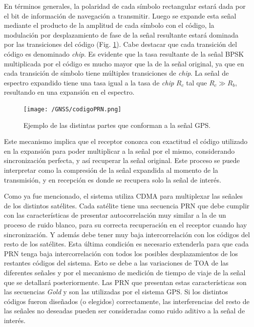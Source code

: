 \documentclass[a4paper,12pt,oneside,onecolumn,final,openright]{book}%
\begin{document}
	En términos generales, la polaridad de cada símbolo rectangular estará dada por el bit de información de navegación a transmitir. Luego se expande esta señal mediante el producto de la amplitud de cada símbolo con el código, la modulación por desplazamiento de fase de la señal resultante estará dominada por las transiciones del código (Fig. \ref{fig:PRN}). Cabe destacar que cada transición del código es denominado \textit{chip}. Es evidente que la tasa resultante de la señal BPSK multiplicada por el código es mucho mayor que la de la señal original, ya que en cada transición de símbolo tiene múltiples transiciones de \textit{chip}. La señal de espectro expandido tiene una tasa igual a la tasa de \textit{chip} $R_c$ tal que $R_c \gg R_b$, resultando en una expansión en el espectro.
\begin{figure}%
    \centering
    \texttt{[image: /GNSS/codigoPRN.png]}
    \caption{Ejemplo de las distintas partes que conforman a la señal GPS.}
    \label{fig:PRN}
\end{figure}

	Este mecanismo implica que el receptor conozca con exactitud el código utilizado en la expansión para poder multiplicar a la señal por el mismo, considerando sincronización perfecta, y así recuperar la señal original. Este proceso se puede interpretar como la compresión de la señal expandida al momento de la transmisión, y en recepción es donde se recupera solo la señal de interés.
	
	Como ya fue mencionado, el sistema utiliza CDMA para multiplexar las señales de los distintos satélites. Cada satélite tiene una secuencia PRN que debe cumplir con las características de presentar autocorrelación muy similar a la de un proceso de ruido blanco, para su correcta recuperación en el receptor cuando hay sincronización. Y además debe tener muy baja intercorrelación con los códigos del resto de los satélites. Esta última condición es necesario extenderla para que cada PRN tenga baja intercorrelación con todos los posibles desplazamientos de los restantes códigos del sistema. Esto se debe a las variaciones de TOA de las diferentes señales y por el mecanismo de medición de tiempo de viaje de la señal que se detallará posteriormente. Las PRN que presentan estas características son las secuencias \textit{Gold} \cite{proakis} y son las utilizadas por el sistema GPS. Si los distintos códigos fueron diseñados (o elegidos) correctamente, las interferencias del resto de las señales no deseadas pueden ser consideradas como ruido aditivo a la señal de interés.
	
\end{document}
